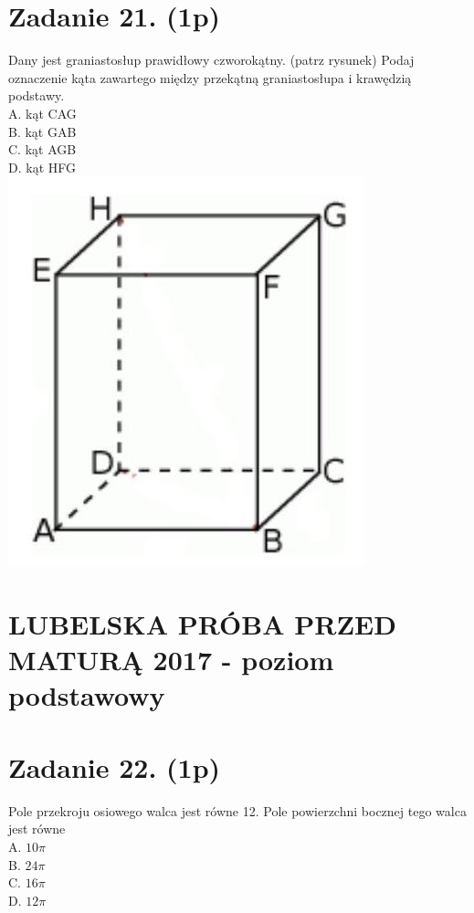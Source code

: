 \documentclass[10pt]{article}
\begin{document}
\section*{Zadanie 21. (1p)}
Dany jest graniastosłup prawidłowy czworokątny. (patrz rysunek) Podaj oznaczenie kąta zawartego między przekątną graniastosłupa i krawędzią podstawy.\\
A. kąt CAG\\
B. kąt GAB\\
C. kąt AGB\\
D. kąt HFG\\
\includegraphics[max width=\textwidth, center]{2024_11_21_2a465a6670163fcfd70dg-06}

\section*{LUBELSKA PRÓBA PRZED MATURĄ 2017 - poziom podstawowy}
\section*{Zadanie 22. (1p)}
Pole przekroju osiowego walca jest równe 12. Pole powierzchni bocznej tego walca jest równe\\
A. \(10 \pi\)\\
B. \(24 \pi\)\\
C. \(16 \pi\)\\
D. \(12 \pi\)
\end{document}
